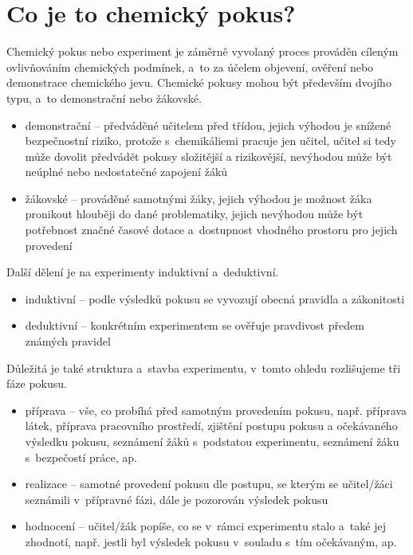 
\section{Co je to chemický pokus?}
Chemický pokus nebo experiment je záměrně vyvolaný proces prováděn cíleným ovlivňováním chemických podmínek, a~to za účelem objevení, ověření nebo demonstrace chemického jevu. Chemické pokusy mohou být především dvojího typu, a~to demonstrační nebo žákovské. \cite{badani}
\begin{itemize}
  \item demonstrační -- předváděné učitelem před třídou, jejich výhodou je snížené bezpečnostní riziko, protože s~chemikáliemi pracuje jen učitel, učitel si tedy může dovolit předvádět pokusy složitější a rizikovější, nevýhodou může být neúplné nebo nedostatečné zapojení žáků
  \item žákovské -- prováděné samotnými žáky, jejich výhodou je možnost žáka pronikout hlouběji do dané problematiky, jejich nevýhodou může být potřebnost značné časové dotace a~dostupnost vhodného prostoru pro jejich provedení
\end{itemize}
Další dělení je na experimenty induktivní a~deduktivní. \cite{badani}
\begin{itemize}
  \item induktivní -- podle výsledků pokusu se vyvozují obecná pravidla a zákonitosti
  \item deduktivní -- konkrétním experimentem se ověřuje pravdivost předem známých pravidel
\end{itemize}
Důležitá je také struktura a~stavba experimentu, v~tomto ohledu rozlišujeme tři fáze pokusu. \cite{badani}
\begin{itemize}
  \item příprava -- vše, co probíhá před samotným provedením pokusu, např. příprava látek, příprava pracovního prostředí, zjištění postupu pokusu a očekávaného výsledku pokusu, seznámení žáků s~podstatou experimentu, seznámení žáku s~bezpečostí práce, ap.
  \item realizace -- samotné provedení pokusu dle postupu, se kterým se učitel/žáci seznámili v~přípravné fázi, dále je pozorován výsledek pokusu
  \item hodnocení -- učitel/žák popíše, co se v~rámci experimentu stalo a~také jej zhodnotí, např. jestli byl výsledek pokusu v~souladu s~tím očekávaným, ap.
\end{itemize}


